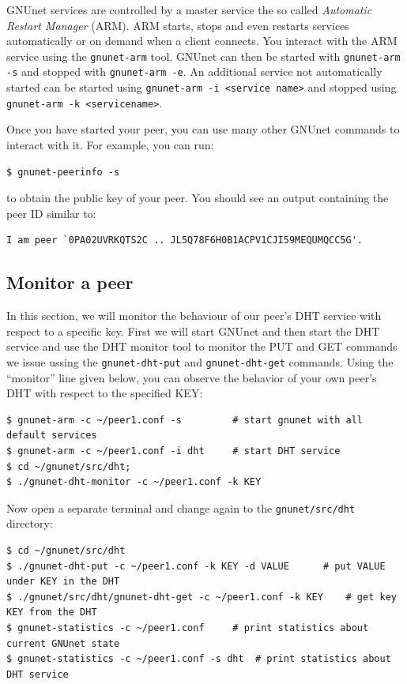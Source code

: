 \documentclass[10pt]{article}
\begin{document}
GNUnet services are controlled by a master service the so called \textit{Automatic Restart Manager} (ARM).
ARM starts, stops and even restarts services automatically or on demand when a client connects.
You interact with the ARM service using the \lstinline|gnunet-arm| tool.
GNUnet can then be started with \lstinline|gnunet-arm -s| and stopped with
\lstinline|gnunet-arm -e|.  An additional service not automatically started
can be started using \lstinline|gnunet-arm -i <service name>| and stopped
using \lstinline|gnunet-arm -k <servicename>|.

Once you have started your peer, you can use many other GNUnet commands
to interact with it.  For example, you can run:
\lstset{language=bash}
\begin{lstlisting}
$ gnunet-peerinfo -s
\end{lstlisting}
to obtain the public key of your peer.
You should see an output containing the peer ID similar to:
\lstset{language=bash}
\begin{lstlisting}
I am peer `0PA02UVRKQTS2C .. JL5Q78F6H0B1ACPV1CJI59MEQUMQCC5G'.
\end{lstlisting}


\subsection{Monitor a peer}
In this section, we will monitor the behaviour of our peer's DHT service with respect to a
specific key. First we will start GNUnet and then start the DHT service and use the DHT monitor tool
to monitor the PUT and GET commands we issue ussing the \lstinline|gnunet-dht-put| and
\lstinline|gnunet-dht-get| commands. Using the ``monitor'' line given below, you can observe the behavior of
your own peer's DHT with respect to the specified KEY:

\lstset{language=bash}
\begin{lstlisting}
$ gnunet-arm -c ~/peer1.conf -s			# start gnunet with all default services
$ gnunet-arm -c ~/peer1.conf -i dht		# start DHT service
$ cd ~/gnunet/src/dht;
$ ./gnunet-dht-monitor -c ~/peer1.conf -k KEY
\end{lstlisting}
Now open a separate terminal and change again to the \lstinline|gnunet/src/dht| directory:
\begin{lstlisting}
$ cd ~/gnunet/src/dht
$ ./gnunet-dht-put -c ~/peer1.conf -k KEY -d VALUE		# put VALUE under KEY in the DHT
$ ./gnunet/src/dht/gnunet-dht-get -c ~/peer1.conf -k KEY	# get key KEY from the DHT
$ gnunet-statistics -c ~/peer1.conf		# print statistics about current GNUnet state
$ gnunet-statistics -c ~/peer1.conf -s dht	# print statistics about DHT service
\end{lstlisting}
\end{document}
